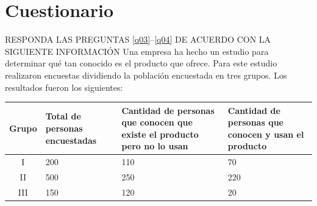 \documentclass[10pt,addpoints]{exam}
\begin{document}
\section*{Cuestionario}
RESPONDA LAS PREGUNTAS \ref{q03}--\ref{q04} DE ACUERDO CON LA SIGUIENTE INFORMACIÓN
Una empresa ha hecho un estudio para determinar qué tan conocido es el producto que ofrece. Para este estudio realizaron encuestas dividiendo la población encuestada en tres grupos. Los resultados fueron los siguientes:
\begin{center}
\begin{tabular}{|c|p{1.85cm}|p{4cm}|p{3cm}|}
\hline 
Grupo & Total de personas encuestadas & Cantidad de personas que conocen que existe el producto pero no lo usan & Cantidad de personas que conocen y usan el producto \\ 
\hline 
I & \hspace*{.5cm}200 & \hspace*{1.5cm}110 & \hspace*{1cm}70 \\ 
\hline 
II & \hspace*{.5cm}500 & \hspace*{1.5cm}250 & \hspace*{1cm}220 \\ 
\hline 
III & \hspace*{.5cm}150 & \hspace*{1.5cm}120 & \hspace*{1cm}20 \\ 
\hline 
\end{tabular} 
\end{center}
\end{document}
